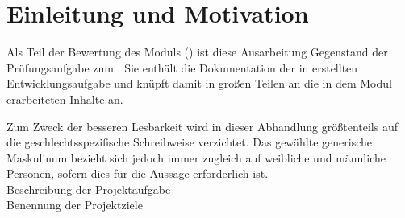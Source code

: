 \chapter{Einleitung und Motivation}
\label{ch:00-introduction-and-motivation}

Als Teil der Bewertung des Moduls \flqq \course (\courseAbbreviation)\frqq\xspace ist diese Ausarbeitung Gegenstand der Prüfungsaufgabe zum \semester. Sie enthält die Dokumentation der in  erstellten Entwicklungsaufgabe und knüpft damit in großen Teilen an die in dem Modul erarbeiteten Inhalte an.

Zum Zweck der besseren Lesbarkeit wird in dieser Abhandlung größtenteils auf die geschlechtsspezifische Schreibweise verzichtet.
Das gewählte generische Maskulinum bezieht sich jedoch immer zugleich auf weibliche und männliche Personen, sofern dies für die Aussage erforderlich ist.\\

Beschreibung der Projektaufgabe\\

Benennung der Projektziele\\